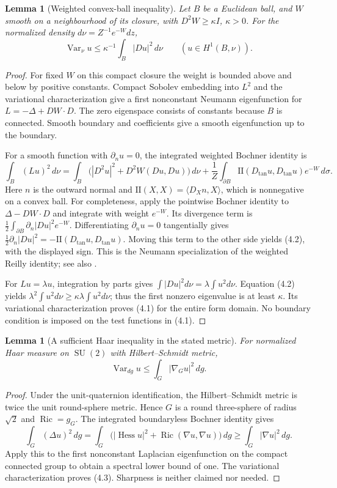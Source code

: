 \documentclass[11pt,oneside]{article}
\newtheorem{lemma}[theorem]{Lemma}
\DeclareMathOperator{\Var}{Var}
\DeclareMathOperator{\Hess}{Hess}
\DeclareMathOperator{\Ric}{Ric}
\DeclareMathOperator{\SU}{SU}
\begin{document}
\begin{lemma}[Weighted convex-ball inequality]
\label{lem:ball}
Let \(B\) be a Euclidean ball, and \(W\) smooth
on a neighbourhood of its closure, with
\(D^2W\ge\kappa I\), \(\kappa>0\).
For the normalized density \(d\nu=Z^{-1}e^{-W}dz\),
\[
                \Var_\nu u\le\kappa^{-1}
                         \int_B|Du|^2\,d\nu
                         \qquad(u\in H^1(B,\nu)).
 \tag{4.1}
\]
\end{lemma}
\begin{proof}
For fixed \(W\) on this compact closure the
weight is bounded above and below by positive
constants. Compact Sobolev embedding into
\(L^2\) and the variational characterization
give a first nonconstant Neumann eigenfunction
for \(L=-\Delta+DW\cdot D\). The zero
eigenspace consists of constants because
\(B\) is connected. Smooth boundary and
coefficients give a smooth eigenfunction
up to the boundary.

For a smooth function with \(\partial_n u=0\),
the integrated weighted Bochner identity is
\[
 \int_B(Lu)^2\,d\nu
 =\int_B\bigl(|D^2u|^2+D^2W(Du,Du)\bigr)\,d\nu
  +\frac1Z\int_{\partial B}
                 \mathrm{II}(D_{\tan}u,D_{\tan}u)e^{-W}\,d\sigma .
 \tag{4.2}
\]
Here \(n\) is the outward normal and
\(\mathrm{II}(X,X)=\langle D_Xn,X\rangle\),
which is nonnegative on a convex ball.
For completeness, apply the pointwise
Bochner identity to \(\Delta-DW\cdot D\)
and integrate with weight \(e^{-W}\).
Its divergence term is
\(\frac12\int_{\partial B}\partial_n|Du|^2e^{-W}\).
Differentiating \(\partial_nu=0\) tangentially
gives
\(\frac12\partial_n|Du|^2
=-\mathrm{II}(D_{\tan}u,D_{\tan}u)\).
Moving this term to the other side yields
(4.2), with the displayed sign.
This is the Neumann specialization of the
weighted Reilly identity; see also
\cite{kolesnikov-milman}.

For \(Lu=\lambda u\), integration by parts gives
\(\int|Du|^2d\nu=\lambda\int u^2d\nu\).
Equation (4.2) yields
\(\lambda^2\int u^2d\nu
\ge\kappa\lambda\int u^2d\nu\);
thus the first nonzero eigenvalue is at
least \(\kappa\). Its variational
characterization proves (4.1) for the
entire form domain. No boundary condition
is imposed on the test functions in (4.1).
\end{proof}

\begin{lemma}[A sufficient Haar inequality in the stated metric]
\label{lem:haar}
For normalized Haar measure on \(\SU(2)\)
with Hilbert--Schmidt metric,
\[
                   \Var_{dg}u\le\int_G|\nabla_Gu|^2\,dg.
 \tag{4.3}
\]
\end{lemma}
\begin{proof}
Under the unit-quaternion identification,
the Hilbert--Schmidt metric is twice the
unit round-sphere metric. Hence \(G\) is
a round three-sphere of radius \(\sqrt2\)
and \(\Ric=g_G\). The integrated
boundaryless Bochner identity gives
\[
 \int_G(\Delta u)^2\,dg
 =\int_G\bigl(|\Hess u|^2+\Ric(\nabla u,\nabla u)\bigr)\,dg
 \ge\int_G|\nabla u|^2\,dg.
\]
Apply this to the first nonconstant
Laplacian eigenfunction on the compact
connected group to obtain a spectral
lower bound of one. The variational
characterization proves (4.3).
Sharpness is neither claimed nor needed.
\end{proof}
\end{document}
